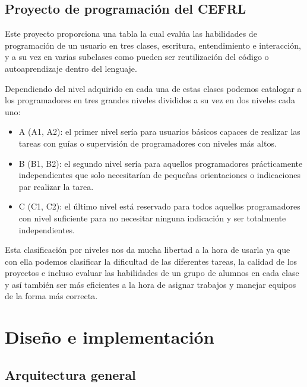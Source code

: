 \documentclass[a4paper, 12pt]{book}
\begin{document}
\section{Proyecto de programación del CEFRL}
\label{Proyecto de programación del CEFRL}

Este proyecto proporciona una tabla la cual evalúa las habilidades de programación de un usuario en tres clases, escritura, entendimiento e interacción, y a su vez en varias subclases como pueden ser reutilización del código o autoaprendizaje dentro del lenguaje.

Dependiendo del nivel adquirido en cada una de estas clases podemos catalogar a los programadores en tres grandes niveles divididos a su vez en dos niveles cada uno: 

\begin{itemize}
	\item A (A1, A2): el primer nivel sería para usuarios básicos capaces de realizar las tareas con guías o supervisión de programadores con niveles más altos.
	\item B (B1, B2): el segundo nivel sería para aquellos programadores prácticamente independientes que solo necesitarían de pequeñas orientaciones o indicaciones par realizar la tarea.
	\item C (C1, C2): el último nivel está reservado para todos aquellos programadores con nivel suficiente para no necesitar ninguna indicación y ser totalmente independientes.
\end{itemize}

Esta clasificación por niveles nos da mucha libertad a la hora de usarla ya que con ella podemos clasificar la dificultad de las diferentes tareas, la calidad de los proyectos e incluso evaluar las habilidades de un grupo de alumnos en cada clase y así también ser más eficientes a la hora de asignar trabajos y manejar equipos de la forma más correcta.


\cleardoublepage
\chapter{Diseño e implementación}

\section{Arquitectura general} 
\label{sec:arquitectura}
\end{document}
